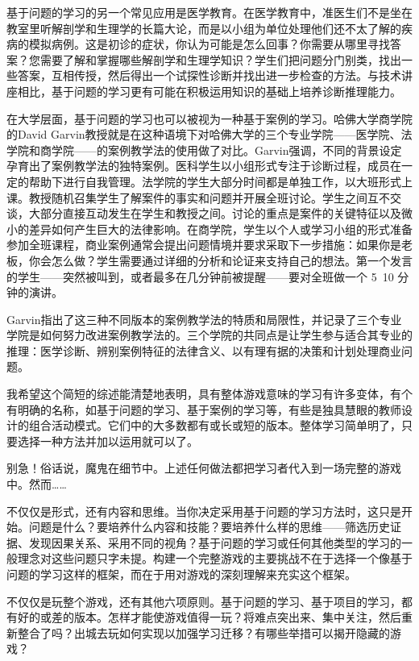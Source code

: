 基于问题的学习的另一个常见应用是医学教育。在医学教育中，准医生们不是坐在教室里听解剖学和生理学的长篇大论，而是以小组为单位处理他们还不太了解的疾病的模拟病例。这是初诊的症状，你认为可能是怎么回事？你需要从哪里寻找答案？您需要了解和掌握哪些解剖学和生理学知识？学生们把问题分门别类，找出一些答案，互相传授，然后得出一个试探性诊断并找出进一步检查的方法。与技术讲座相比，基于问题的学习更有可能在积极运用知识的基础上培养诊断推理能力。

在大学层面，基于问题的学习也可以被视为一种基于案例的学习。哈佛大学商学院的David Garvin教授就是在这种语境下对哈佛大学的三个专业学院——医学院、法学院和商学院——的案例教学法的使用做了对比。Garvin强调，不同的背景设定孕育出了案例教学法的独特案例。医科学生以小组形式专注于诊断过程，成员在一定的帮助下进行自我管理。法学院的学生大部分时间都是单独工作，以大班形式上课。教授随机召集学生了解案件的事实和问题并开展全班讨论。学生之间互不交谈，大部分直接互动发生在学生和教授之间。讨论的重点是案件的关键特征以及微小的差异如何产生巨大的法律影响。在商学院，学生以个人或学习小组的形式准备参加全班课程，商业案例通常会提出问题情境并要求采取下一步措施：如果你是老板，你会怎么做？学生需要通过详细的分析和论证来支持自己的想法。第一个发言的学生——突然被叫到，或者最多在几分钟前被提醒——要对全班做一个 5~10 分钟的演讲。

Garvin指出了这三种不同版本的案例教学法的特质和局限性，并记录了三个专业学院是如何努力改进案例教学法的。三个学院的共同点是让学生参与适合其专业的推理：医学诊断、辨别案例特征的法律含义、以有理有据的决策和计划处理商业问题。

我希望这个简短的综述能清楚地表明，具有整体游戏意味的学习有许多变体，有个有明确的名称，如基于问题的学习、基于案例的学习等，有些是独具慧眼的教师设计的组合活动模式。它们中的大多数都有或长或短的版本。整体学习简单明了，只要选择一种方法并加以运用就可以了。

别急！俗话说，魔鬼在细节中。上述任何做法都把学习者代入到一场完整的游戏中。然而……

不仅仅是形式，还有内容和思维。当你决定采用基于问题的学习方法时，这只是开始。问题是什么？要培养什么内容和技能？要培养什么样的思维——筛选历史证据、发现因果关系、采用不同的视角？基于问题的学习或任何其他类型的学习的一般理念对这些问题只字未提。构建一个完整游戏的主要挑战不在于选择一个像基于问题的学习这样的框架，而在于用对游戏的深刻理解来充实这个框架。

不仅仅是玩整个游戏，还有其他六项原则。基于问题的学习、基于项目的学习，都有好的或差的版本。怎样才能使游戏值得一玩？将难点突出来、集中关注，然后重新整合了吗？出城去玩如何实现以加强学习迁移？有哪些举措可以揭开隐藏的游戏？

